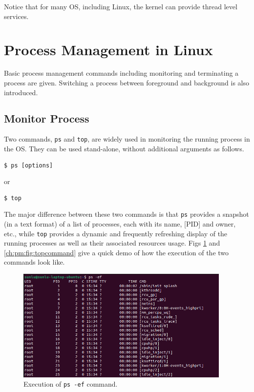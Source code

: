 Notice that for many OS, including Linux, the kernel can provide thread level services.

\section{Process Management in Linux}

Basic process management commands including monitoring and terminating a process are given. Switching a process between foreground and background is also introduced.

\subsection{Monitor Process}

Two commands, \verb|ps| and \verb|top|, are widely used in monitoring the running process in the OS. They can be used stand-alone, without additional arguments as follows.
\begin{lstlisting}
$ ps [options]
\end{lstlisting}
or
\begin{lstlisting}
$ top
\end{lstlisting}

The major difference between these two commands is that \verb|ps| provides a snapshot (in a text format) of a list of processes, each with its name, [PID] and owner, etc., while \verb|top| provides a dynamic and frequently refreshing display of the running processes as well as their associated resources usage. Figs \ref{ch:pm:fig:pscommand} and \ref{ch:pm:fig:topcommand} give a quick demo of how the execution of the two commands look like.

\begin{figure}[!htb]
	\centering
	\includegraphics[width=300pt]{chapters/part-1/figures/pscommand.png}
	\caption{Execution of \texttt{ps -ef} command.} \label{ch:pm:fig:pscommand}
\end{figure}

